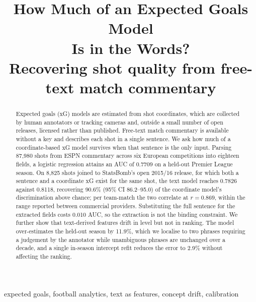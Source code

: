 \documentclass[conference]{IEEEtran}
\newcommand{\num}[1]{\mbox{#1}}
\begin{document}
\title{How Much of an Expected Goals Model\\Is in the Words?\\[2pt]
\large Recovering shot quality from free-text match commentary}

\author{
}

\maketitle

\begin{abstract}
Expected goals (xG) models are estimated from shot coordinates, which are
collected by human annotators or tracking cameras and, outside a small number
of open releases, licensed rather than published. Free-text match commentary is
available without a key and describes each shot in a single sentence. We ask
how much of a coordinate-based xG model survives when that sentence is the only
input. Parsing \num{87,980} shots from ESPN commentary across six European
competitions into eighteen fields, a logistic regression attains an AUC of
\num{0.7709} on a held-out Premier League season. On \num{8,825} shots joined
to StatsBomb's open 2015/16 release, for which both a sentence and a coordinate
xG exist for the same shot, the text model reaches \num{0.7826} against
\num{0.8118}, recovering 90.6\% (95\% CI 86.2--95.0) of the coordinate model's
discrimination above chance; per team-match the two correlate at
$r=\num{0.869}$, within the range reported between commercial providers.
Substituting the full sentence for the extracted fields costs \num{0.010} AUC,
so the extraction is not the binding constraint. We further show that
text-derived features drift in level but not in ranking. The model
over-estimates the held-out season by 11.9\%, which we localise to two phrases
requiring a judgement by the annotator while unambiguous phrases are unchanged
over a decade, and a single in-season intercept refit reduces the error to
2.9\% without affecting the ranking.
\end{abstract}

\begin{IEEEkeywords}
expected goals, football analytics, text as features, concept drift,
calibration
\end{IEEEkeywords}
\end{document}

